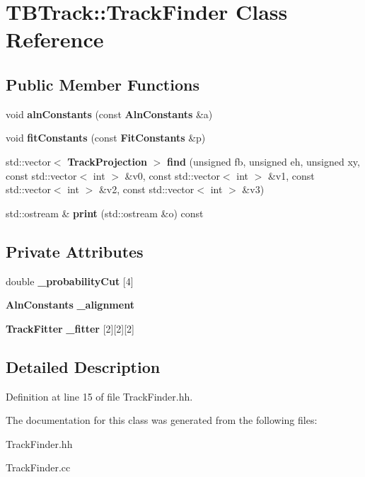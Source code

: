 \section{T\-B\-Track\-:\-:Track\-Finder Class Reference}
\label{classTBTrack_1_1TrackFinder}
\subsection*{Public Member Functions}
\begin{DoxyCompactItemize}
\item 
void {\bfseries aln\-Constants} (const {\bf Aln\-Constants} \&a)\label{classTBTrack_1_1TrackFinder_a6cb7c604ec9cf38348f22d050cc7bb49}

\item 
void {\bfseries fit\-Constants} (const {\bf Fit\-Constants} \&p)\label{classTBTrack_1_1TrackFinder_aa1c57148ca9c5c72afb5045fcd2b55d3}

\item 
std\-::vector$<$ {\bf Track\-Projection} $>$ {\bfseries find} (unsigned fb, unsigned eh, unsigned xy, const std\-::vector$<$ int $>$ \&v0, const std\-::vector$<$ int $>$ \&v1, const std\-::vector$<$ int $>$ \&v2, const std\-::vector$<$ int $>$ \&v3)\label{classTBTrack_1_1TrackFinder_a6378897788259d0afcd9cf9e40761bba}

\item 
std\-::ostream \& {\bfseries print} (std\-::ostream \&o) const \label{classTBTrack_1_1TrackFinder_a0b01ceac7e2eef542eafa25d656ba1b4}

\end{DoxyCompactItemize}
\subsection*{Private Attributes}
\begin{DoxyCompactItemize}
\item 
double {\bfseries \-\_\-probability\-Cut} [4]\label{classTBTrack_1_1TrackFinder_af4cc2dd72bf92295fbe97b2382b65e15}

\item 
{\bf Aln\-Constants} {\bfseries \-\_\-alignment}\label{classTBTrack_1_1TrackFinder_ab100899aad4b03c3844f0e662d3fa86a}

\item 
{\bf Track\-Fitter} {\bfseries \-\_\-fitter} [2][2][2]\label{classTBTrack_1_1TrackFinder_a6e2c245adc3633995c352d177de4367d}

\end{DoxyCompactItemize}


\subsection{Detailed Description}


Definition at line 15 of file Track\-Finder.\-hh.



The documentation for this class was generated from the following files\-:\begin{DoxyCompactItemize}
\item 
Track\-Finder.\-hh\item 
Track\-Finder.\-cc\end{DoxyCompactItemize}
